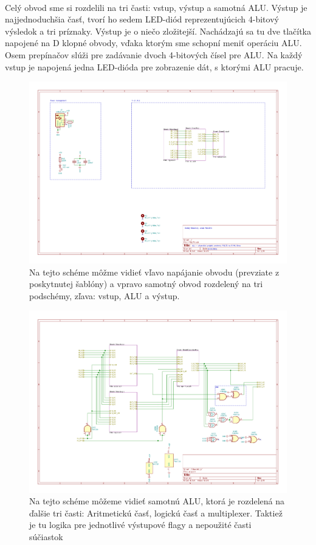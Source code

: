 \documentclass{article}
\begin{document}
    \paragraph{}
    Celý obvod sme si rozdelili na tri časti: vstup, výstup a samotná ALU. Výstup je najjednoduchšia časť, tvorí ho sedem LED-diód reprezentujúcich 4-bitový výsledok a tri príznaky. Výstup je o niečo zložitejší. Nachádzajú sa tu dve tlačítka napojené na D klopné obvody, vďaka ktorým sme schopní meniť operáciu ALU. Osem prepínačov slúži pre zadávanie dvoch 4-bitových čísel pre ALU. Na každý vstup je napojená jedna LED-dióda pre zobrazenie dát, s ktorými ALU pracuje.

    \begin{figure}[h!]
        \centering
        \includegraphics[width=.9\linewidth]{top_sheet.pdf}
        \caption{Na tejto schéme môžme vidieť vľavo napájanie obvodu (prevziate z poskytnutej šablóny) a vpravo samotný obvod rozdelený na tri podschémy, zľava: vstup, ALU a výstup.}
    \end{figure}

    \begin{figure}[h!]
        \centering
        \includegraphics[width=.9\linewidth]{alu_sheet.pdf}
        \caption{Na tejto schéme môžeme vidieť samotnú ALU, ktorá je rozdelená na ďalšie tri časti: Aritmetickú časť, logickú časť a multiplexer. Taktiež je tu logika pre jednotlivé výstupové flagy a nepoužité časti súčiastok}
    \end{figure}
\end{document}

